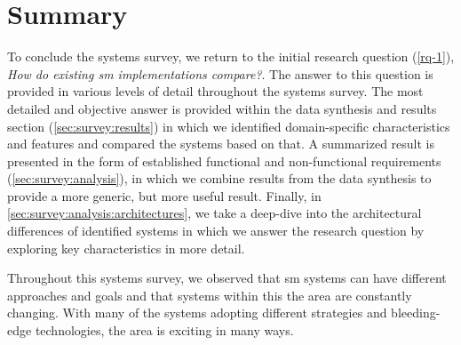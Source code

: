 \section{Summary}
\label{sec:survey:summary}

To conclude the systems survey, we return to the initial research question (\ref{rq-1}), \textit{How do existing \gls{sm} implementations compare?}. The answer to this question is provided in various levels of detail throughout the systems survey. The most detailed and objective answer is provided  within the data synthesis and results section (\cref{sec:survey:results}) in which we identified domain-specific characteristics and features and compared the systems based on that. A summarized result is presented in the form of established functional and non-functional requirements (\cref{sec:survey:analysis}), in which we combine results from the data synthesis to provide a more generic, but more useful result. Finally, in \cref{sec:survey:analysis:architectures}, we take a deep-dive into the architectural differences of identified systems in which we answer the research question by exploring key characteristics in more detail.

Throughout this systems survey, we observed that \gls{sm} systems can have different approaches and goals and that systems within this the area are constantly changing. With many of the systems adopting different strategies and bleeding-edge technologies, the area is exciting in many ways. 